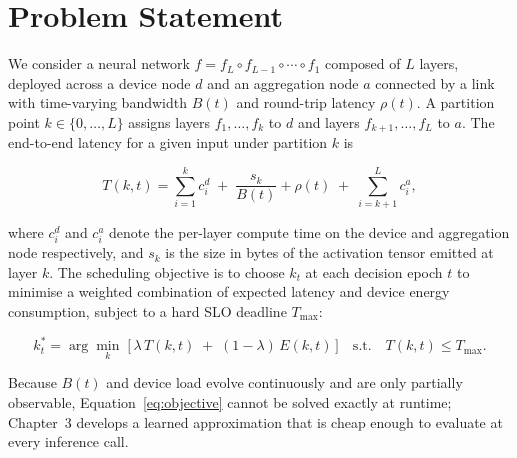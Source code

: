 \section{Problem Statement}

We consider a neural network $f = f_L \circ f_{L-1} \circ \cdots \circ f_1$ composed of $L$ layers, deployed across a device node $d$ and an aggregation node $a$ connected by a link with time-varying bandwidth $B(t)$ and round-trip latency $\rho(t)$. A partition point $k \in \{0, \ldots, L\}$ assigns layers $f_1, \ldots, f_k$ to $d$ and layers $f_{k+1}, \ldots, f_L$ to $a$. The end-to-end latency for a given input under partition $k$ is

\begin{equation}
T(k, t) = \sum_{i=1}^{k} c_i^{d} \;+\; \frac{s_k}{B(t)} + \rho(t) \;+\; \sum_{i=k+1}^{L} c_i^{a},
\label{eq:latency}
\end{equation}

\noindent where $c_i^{d}$ and $c_i^{a}$ denote the per-layer compute time on the device and aggregation node respectively, and $s_k$ is the size in bytes of the activation tensor emitted at layer $k$. The scheduling objective is to choose $k_t$ at each decision epoch $t$ to minimise a weighted combination of expected latency and device energy consumption, subject to a hard SLO deadline $T_{\max}$:

\begin{equation}
k_t^{*} = \arg\min_{k} \; \Big[ \, \lambda \, T(k, t) \;+\; (1-\lambda)\, E(k, t) \, \Big] \quad \text{s.t.} \quad T(k, t) \le T_{\max}.
\label{eq:objective}
\end{equation}

Because $B(t)$ and device load evolve continuously and are only partially observable, Equation~\ref{eq:objective} cannot be solved exactly at runtime; Chapter~3 develops a learned approximation that is cheap enough to evaluate at every inference call.
